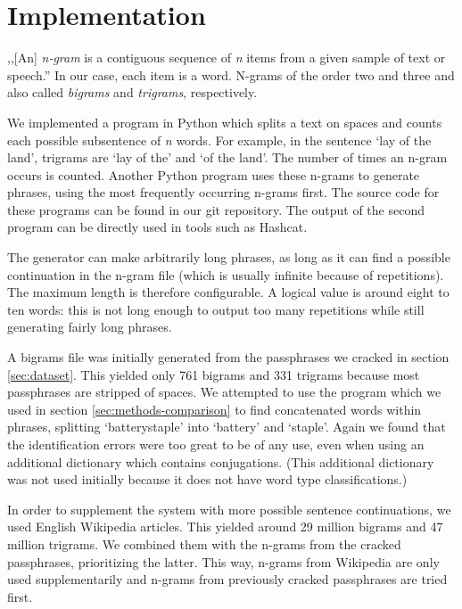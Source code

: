 \documentclass{article}
\begin{document}
\section{Implementation}\label{sec:implementation}

,,[An] {\it n-gram} is a contiguous sequence of {\it n} items from a given
sample of text or speech.''\cite{wiki-ngram} In our case, each item is a word.
N-grams of the order two and three and also called {\it bigrams} and {\it
trigrams}, respectively.

We implemented a program in Python which splits a text on spaces and counts
each possible subsentence of {\it n} words. For example, in the sentence `lay
of the land', trigrams are `lay of the' and `of the land'. The number of times
an n-gram occurs is counted. Another Python program uses these n-grams to
generate phrases, using the most frequently occurring n-grams first. The source
code for these programs can be found in our git repository\cite{git}. The
output of the second program can be directly used in tools such as Hashcat.

The generator can make arbitrarily long phrases, as long as it can find a
possible continuation in the n-gram file (which is usually infinite because of
repetitions). The maximum length is therefore configurable. A logical value is
around eight to ten words: this is not long enough to output too many
repetitions while still generating fairly long phrases.

A bigrams file was initially generated from the passphrases we cracked in
section \ref{sec:dataset}. This yielded only 761 bigrams and 331 trigrams
because most passphrases are stripped of spaces. We attempted to use the
program which we used in section \ref{sec:methods-comparison} to find
concatenated words within phrases, splitting `batterystaple' into `battery' and
`staple'. Again we found that the identification errors were too great to be of
any use, even when using an additional dictionary\cite{wamerican} which
contains conjugations. (This additional dictionary was not used initially
because it does not have word type classifications.)

In order to supplement the system with more possible sentence continuations, we
used English Wikipedia articles. This yielded around 29 million bigrams and 47
million trigrams. We combined them with the n-grams from the cracked
passphrases, prioritizing the latter. This way, n-grams from Wikipedia are only
used supplementarily and n-grams from previously cracked passphrases are
tried first.
\end{document}
